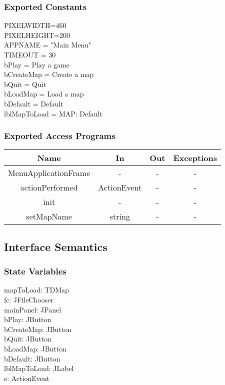 \documentclass[12,english]{article}
\begin{document}
	    \subsubsection{Exported Constants}
	    PIXELWIDTH=460\\
	    PIXELHEIGHT=200\\
	    APPNAME = "Main Menu"\\
	    TIMEOUT = 30\\
	    bPlay = Play a game\\
	    bCreateMap = Create a map\\
	    bQuit = Quit\\
	    bLoadMap = Load a map\\
	    bDefault = Default\\
	    lblMapToLoad = MAP: Default\\
		\subsubsection{Exported Access Programs}
		
	\begin{tabular}[pos]{|c|c|c|c|}
	\hline
	\textbf{Name}& \textbf{In} & \textbf{Out} & \textbf{Exceptions} \\ 
	\hline
	MenuApplicationFrame & - & - & - \\ \hline
	actionPerformed & ActionEvent& - & - \\ \hline
	init & - & - & - \\ \hline
	setMapName & string & - & - \\ \hline
	
	
					
	\end{tabular}		
		
	\subsection{Interface Semantics}
		\subsubsection{State Variables}
		mapToLoad: TDMap\\
	    fc: JFileChooser\\
	    mainPanel: JPanel\\
	    bPlay: JButton\\
	    bCreateMap: JButton\\
	    bQuit: JButton\\
	    bLoadMap: JButton\\
	    bDefault: JButton\\
	    lblMapToLoad: JLabel\\
	    e: ActionEvent\\
	    
\end{document}
